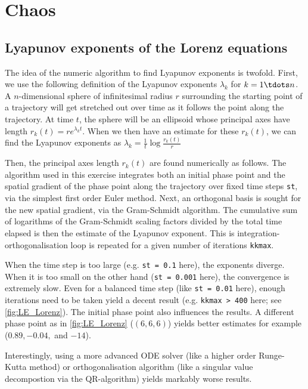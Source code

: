 \graphicspath{{../figures/5/}}


\chapter{Chaos}



\section{Lyapunov exponents of the Lorenz equations}
\label{sec:lorenz}

The idea of the numeric algorithm to find Lyapunov exponents is twofold. First, we use the following definition of the Lyapunov exponents $\lambda_k$ for $k = 1 \tdots n$. A $n$-dimensional sphere of infinitesimal radius $r$ surrounding the starting point of a trajectory will get stretched out over time as it follows the point along the trajectory. At time $t$, the sphere will be an ellipsoid whose principal axes have length $r_k(t) = r e^{\lambda_k t}$. When we then have an estimate for these $r_k(t)$, we can find the Lyapunov exponents as $\lambda_k = \frac{1}{t} \log{\frac{r_k(t)}{r}}$

Then, the principal axes length $r_k(t)$ are found numerically as follows. The algorithm used in this exercise integrates both an initial phase point and the spatial gradient of the phase point along the trajectory over fixed time steps \texttt{st}, via the simplest first order Euler method. Next, an orthogonal basis is sought for the new spatial gradient, via the Gram-Schmidt algorithm. The cumulative sum of logarithms of the Gram-Schmidt scaling factors divided by the total time elapsed is then the estimate of the Lyapunov exponent. This is integration-orthogonalisation loop is repeated for a given number of iterations \texttt{kkmax}.

When the time step is too large (e.g. \texttt{st = 0.1} here), the exponents diverge. When it is too small on the other hand (\texttt{st = 0.001} here), the convergence is extremely slow. Even for a balanced time step (like \texttt{st = 0.01} here), enough iterations need to be taken yield a decent result (e.g. \texttt{kkmax > 400} here; see \cref{fig:LE_Lorenz}). The initial phase point also influences the results. A different phase point as in \cref{fig:LE_Lorenz} ($(6,6,6)$) yields better estimates for example ($0.89, -0.04, $ and $-14$).

Interestingly, using a more advanced ODE solver (like a higher order Runge-Kutta method) or orthogonalisation algorithm (like a singular value decompostion via the QR-algorithm) yields markably worse results.


